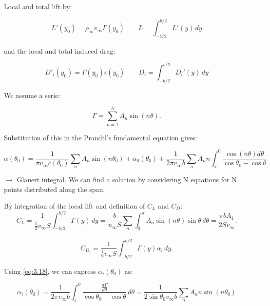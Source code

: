 \documentclass[british,french,11pt, a4paper, openany]{article}
\begin{document}
Local and total lift by:

\begin{equation}
L'(y_0) = \rho _\infty v_\infty \Gamma (y_0) \qquad L = \int _{-b/2}^{b/2} L'(y)\, dy
\end{equation}

and the local and total induced drag: 

\begin{equation}
D'_i (y_0) = \Gamma (y_0) \epsilon (y_0) \qquad D_i = \int _{-b/2}^{b/2} D_i'(y)\, dy
\end{equation}

We assume a serie:

\begin{equation}
\Gamma = \sum _{n=1} ^N A_n \sin (n\theta).
\end{equation}

Substitution of this in the Prandtl's fundamental equation gives:

\begin{equation}
\alpha (\theta _0) = \frac{1}{\pi v_\infty c(\theta _0)} \sum _n A_n \sin (n\theta_0) + \alpha_0(\theta _0) + \frac{1}{2\pi v_\infty b} \sum _n A_n n \int ^0_\pi \frac{\cos (n\theta)d\theta}{\cos \theta _0 - \cos \theta}
\label{eq:3.32}
\end{equation}

$\rightarrow$ Glauert integral. We can find a solution by considering N equations for N points distributed along the span.

By integration of the local lift and definition of $C_L$ and $C_D$:
\begin{equation}
C_L = \frac{1}{\frac{1}{2}v_\infty S} \int _{-b/2}^{b/2} \Gamma (y) \, dy = \frac{b}{u_\infty S} \sum _n \int _0 ^\pi A_n \sin (n\theta) \sin \theta \, d\theta = \frac{\pi b A_1}{2Sv_\infty}. 
\end{equation}

\begin{equation}
C_{D_i} = \frac{1}{\frac{1}{2} v_\infty S} \int _{-b/2} ^{b/2} \Gamma (y)\alpha _i \, dy. 
\end{equation}

Using \eqref{eq:3.18}, we can express $\alpha _i (\theta _0)$ as:

\begin{equation}
\alpha _i (\theta _0) = \frac{1}{2\pi v_\infty b} \int ^{0}_{\pi} \frac{\frac{d\Gamma }{d\theta}}{\cos \theta _0 - \cos \theta} \, d\theta = \frac{1}{2\sin \theta _0 v_\infty b} \sum _n A_n n \sin (n \theta _0)
\end{equation}
\end{document}
